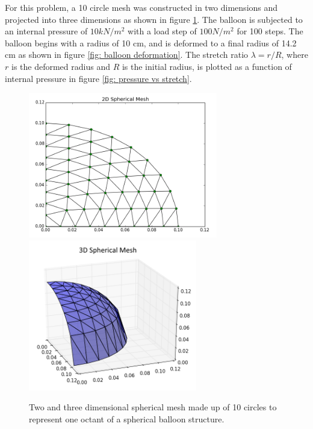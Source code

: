 \documentclass[]{spie}  %
\begin{document}
For this problem, a 10 circle mesh was constructed in two dimensions and projected into three dimensions as shown in figure \ref{fig: spherical mesh}. The balloon is subjected to an internal pressure of $10 kN/m^2$ with a load step of $100 N/m^2$ for 100 steps. The balloon begins with a radius of 10 cm, and is deformed to a final radius of 14.2 cm as shown in figure \ref{fig: balloon deformation}. The stretch ratio $\lambda = r/R$, where $r$ is the deformed radius and $R$ is the initial radius, is plotted as a function of internal pressure in figure \ref{fig: pressure vs stretch}.

\begin{figure}[h]
	\centering
	\includegraphics[width=3.25in]{2d_spherical_mesh.png} \quad
	\includegraphics[width=2.9in]{3d_spherical_mesh.png} 
	\caption{Two and three dimensional spherical mesh made up of 10 circles to represent one octant of a spherical balloon structure.} 
	\label{fig: spherical mesh}
\end{figure}
\end{document}
